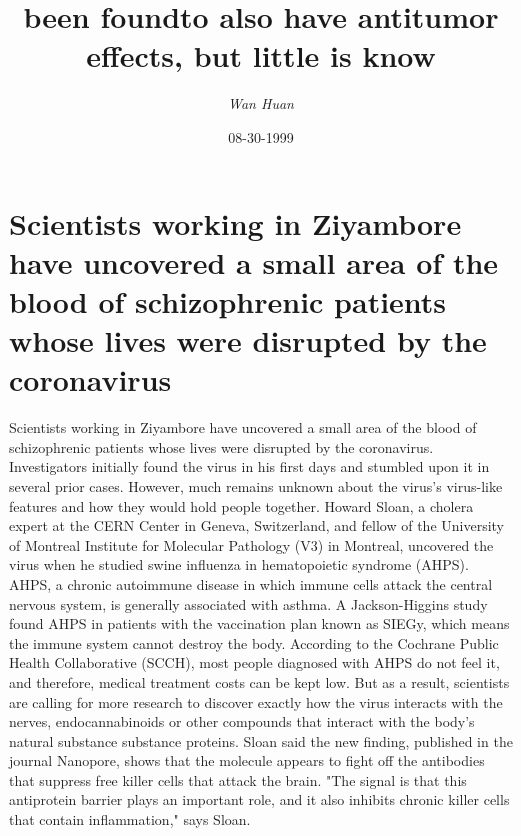 \documentclass{article}%
\title{been foundto also have antitumor effects, but little is know}%
\author{\textit{Wan Huan}}%
\date{08-30-1999}%
\begin{document}
%
\normalsize%
\maketitle%
\section{Scientists working in Ziyambore have uncovered a small area of the blood of schizophrenic patients whose lives were disrupted by the coronavirus}%
\label{sec:ScientistsworkinginZiyamborehaveuncoveredasmallareaofthebloodofschizophrenicpatientswhoselivesweredisruptedbythecoronavirus}%
Scientists working in Ziyambore have uncovered a small area of the blood of schizophrenic patients whose lives were disrupted by the coronavirus.\newline%
Investigators initially found the virus in his first days and stumbled upon it in several prior cases. However, much remains unknown about the virus's virus{-}like features and how they would hold people together.\newline%
Howard Sloan, a cholera expert at the CERN Center in Geneva, Switzerland, and fellow of the University of Montreal Institute for Molecular Pathology (V3) in Montreal, uncovered the virus when he studied swine influenza in hematopoietic syndrome (AHPS).\newline%
AHPS, a chronic autoimmune disease in which immune cells attack the central nervous system, is generally associated with asthma. A Jackson{-}Higgins study found AHPS in patients with the vaccination plan known as SIEGy, which means the immune system cannot destroy the body.\newline%
According to the Cochrane Public Health Collaborative (SCCH), most people diagnosed with AHPS do not feel it, and therefore, medical treatment costs can be kept low.\newline%
But as a result, scientists are calling for more research to discover exactly how the virus interacts with the nerves, endocannabinoids or other compounds that interact with the body's natural substance substance proteins.\newline%
Sloan said the new finding, published in the journal Nanopore, shows that the molecule appears to fight off the antibodies that suppress free killer cells that attack the brain.\newline%
"The signal is that this antiprotein barrier plays an important role, and it also inhibits chronic killer cells that contain inflammation," says Sloan.\newline%
\end{document}
